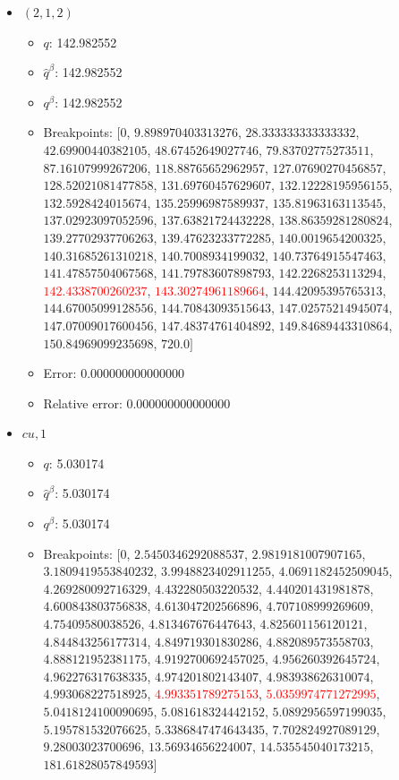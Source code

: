 \documentclass{article}%
\begin{document}
\begin{itemize}
\begin{itemize}
		\item Error: 0.000000000000000%
		\item Relative error: 0.000000000000000%
	\end{itemize}%
	\item $(2, 1, 2)$%
	\begin{itemize}%
		\item $q$: 142.982552%
		\item $\hat{q}^\beta$: 142.982552%
		\item $q^\beta$: 142.982552%
		\item Breakpoints: $[$$0$, $9.898970403313276$, $28.333333333333332$, $42.69900440382105$, $48.67452649027746$, $79.83702775273511$, $87.16107999267206$, $118.88765652962957$, $127.07690270456857$, $128.52021081477858$, $131.69760457629607$, $132.12228195956155$, $132.5928424015674$, $135.25996987589937$, $135.81963163113545$, $137.02923097052596$, $137.63821724432228$, $138.86359281280824$, $139.27702937706263$, $139.47623233772285$, $140.0019654200325$, $140.31685261310218$, $140.7008934199032$, $140.73764915547463$, $141.47857504067568$, $141.79783607898793$, $142.2268253113294$, \textcolor{red}{$142.4338700260237$}, \textcolor{red}{$143.30274961189664$}, $144.42095395765313$, $144.67005099128556$, $144.70843093515643$, $147.02575214945074$, $147.07009017600456$, $147.48374761404892$, $149.84689443310864$, $150.84969099235698$, $720.0$$]$%
		\item Error: 0.000000000000000%
		\item Relative error: 0.000000000000000%
	\end{itemize}%
	\item $\textit{cu},1$%
	\begin{itemize}%
		\item $q$: 5.030174%
		\item $\hat{q}^\beta$: 5.030174%
		\item $q^\beta$: 5.030174%
		\item Breakpoints: $[$$0$, $2.5450346292088537$, $2.9819181007907165$, $3.1809419553840232$, $3.9948823402911255$, $4.0691182452509045$, $4.269280092716329$, $4.432280503220532$, $4.440201431981878$, $4.600843803756838$, $4.613047202566896$, $4.707108999269609$, $4.75409580038526$, $4.813467676447643$, $4.825601156120121$, $4.844843256177314$, $4.849719301830286$, $4.882089573558703$, $4.888121952381175$, $4.9192700692457025$, $4.956260392645724$, $4.962276317638335$, $4.974201802143407$, $4.983938626310074$, $4.993068227518925$, \textcolor{red}{$4.993351789275153$}, \textcolor{red}{$5.0359974771272995$}, $5.0418124100090695$, $5.081618324442152$, $5.0892956597199035$, $5.195781532076625$, $5.3386847474643435$, $7.702824927089129$, $9.28003023700696$, $13.56934656224007$, $14.535545040173215$, $181.61828057849593$$]$%

\end{itemize}
\end{itemize}
\end{document}
